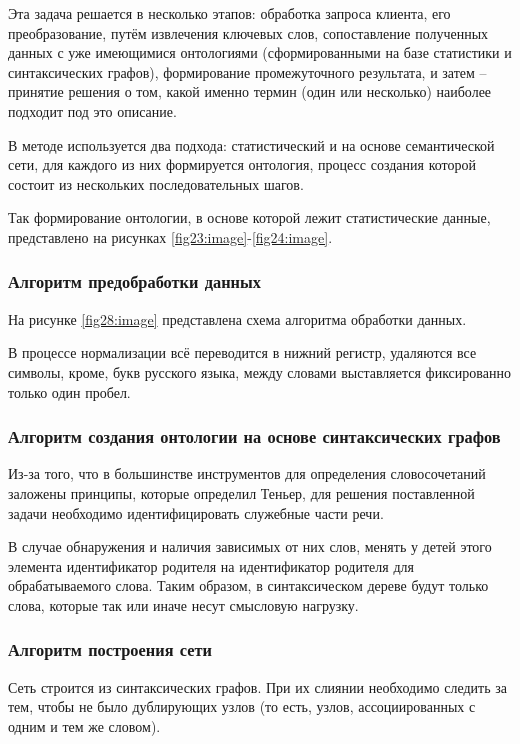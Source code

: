 Эта задача решается в несколько этапов: обработка запроса клиента, его преобразование, путём извлечения ключевых слов, сопоставление полученных данных с уже имеющимися онтологиями (сформированными на базе статистики и синтаксических графов), формирование промежуточного результата, и затем -- принятие решения о том, какой именно термин (один или несколько) наиболее подходит под это описание.


В методе используется два подхода: статистический и на основе семантической сети, для каждого из них формируется онтология, процесс создания которой состоит из нескольких последовательных шагов.

Так формирование онтологии, в основе которой лежит статистические данные, представлено на рисунках \ref{fig23:image}-\ref{fig24:image}. 

\subsubsection{Алгоритм предобработки данных}\label{sec:preprocess}
На рисунке \ref{fig28:image} представлена схема алгоритма обработки данных.

В процессе нормализации всё переводится в нижний регистр, удаляются все символы, кроме, букв русского языка, между словами выставляется фиксированно только один пробел.

\subsubsection{Алгоритм создания онтологии на основе синтаксических графов}
Из-за того, что в большинстве инструментов для определения словосочетаний заложены принципы, которые определил Теньер, для решения поставленной задачи необходимо идентифицировать служебные части речи. 

В случае обнаружения и наличия зависимых от них слов, менять у детей этого элемента идентификатор родителя на идентификатор родителя для обрабатываемого слова. Таким образом, в синтаксическом дереве будут только слова, которые так или иначе несут смысловую нагрузку. 


\subsubsection{Алгоритм построения сети}
Сеть строится из синтаксических графов. При их слиянии необходимо следить за тем, чтобы не было дублирующих узлов (то есть, узлов, ассоциированных с одним и тем же словом). 

